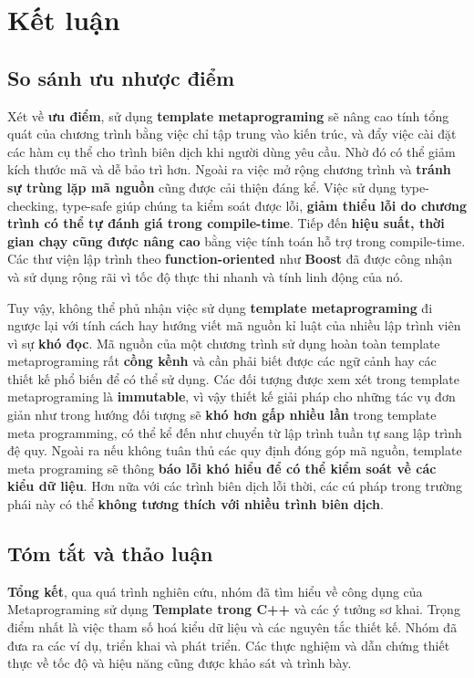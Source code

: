\section{Kết luận}
\subsection{So sánh ưu nhược điểm}
Xét về \textbf{ưu điểm}, sử dụng \textbf{template metaprograming} sẽ nâng cao tính tổng quát của chương trình bằng việc chỉ tập trung vào kiến trúc, và đẩy việc cài đặt các hàm cụ thể cho trình biên dịch khi người dùng yêu cầu. Nhờ đó có thể giảm kích thước mã và dễ bảo trì hơn. Ngoài ra việc mở rộng chương trình và \textbf{tránh sự trùng lặp mã nguồn} cũng được cải thiện đáng kể. Việc sử dụng type-checking, type-safe giúp chúng ta kiểm soát được lỗi, \textbf{giảm thiểu lỗi do chương trình có thể tự đánh giá trong compile-time}. Tiếp đến \textbf{hiệu suất, thời gian chạy cũng được nâng cao} bằng việc tính toán hỗ trợ trong compile-time. Các thư viện lập trình theo \textbf{function-oriented} như \textbf{Boost} đã được công nhận và sử dụng rộng rãi vì tốc độ thực thi nhanh và tính linh động của nó.


Tuy vậy, không thể phủ nhận việc sử dụng \textbf{template metaprograming} đi ngược lại với tính cách hay hướng viết mã nguồn kỉ luật của nhiều lập trình viên vì sự\textbf{ khó đọc}. Mã nguồn của một chương trình sử dụng hoàn toàn template metaprograming rất\textbf{ cồng kềnh} và cần phải biết được các ngữ cảnh hay các thiết kế phổ biến để có thể sử dụng. Các đối tượng được xem xét trong template metaprograming là \textbf{immutable}, vì vậy thiết kế giải pháp cho những tác vụ đơn giản như trong hướng đối tượng sẽ \textbf{khó hơn gấp nhiều lần} trong template meta programming, có thể kể đến như chuyển từ lập trình tuần tự sang lập trình đệ quy. Ngoài ra nếu không tuân thủ các quy định đóng góp mã nguồn, template meta programing sẽ thông \textbf{báo lỗi khó hiểu để có thể kiểm soát về các kiểu dữ liệu}. Hơn nữa với các trình biên dịch lỗi thời, các cú pháp trong trường phái này có thể \textbf{không tương thích với nhiều trình biên dịch}.

\subsection{Tóm tắt và thảo luận}
\textbf{Tổng kết}, qua quá trình nghiên cứu, nhóm đã tìm hiểu về công dụng của Metaprograming sử dụng \textbf{Template trong C++ }và các ý tưởng sơ khai. Trọng điểm nhất là việc tham số hoá kiểu dữ liệu và các nguyên tắc thiết kế. Nhóm đã đưa ra các ví dụ, triển khai và phát triển. Các thực nghiệm và dẫn chứng thiết thực về tốc độ và hiệu năng cũng được khảo sát và trình bày. 

